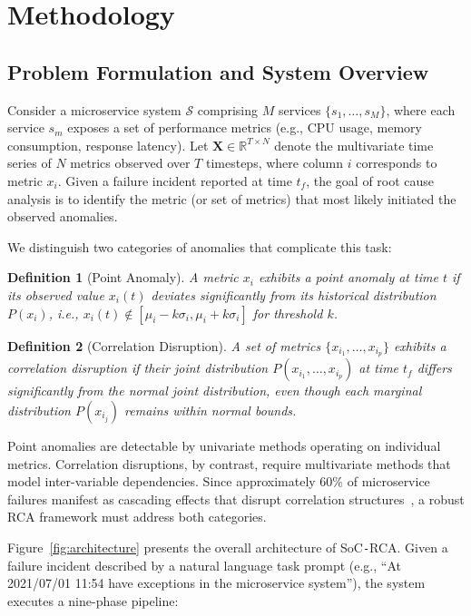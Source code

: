 \documentclass[a4paper,fleqn]{cas-dc}
\newtheorem{definition}{Definition}
\newcommand{\sysname}{SoC\texttt{-}RCA}
\begin{document}
\section{Methodology}
\label{sec:method}

\subsection{Problem Formulation and System Overview}

Consider a microservice system $\mathcal{S}$ comprising $M$ services $\{s_1, \ldots, s_M\}$, where each service $s_m$ exposes a set of performance metrics (e.g., CPU usage, memory consumption, response latency).  Let $\mathbf{X} \in \mathbb{R}^{T \times N}$ denote the multivariate time series of $N$ metrics observed over $T$ timesteps, where column $i$ corresponds to metric $x_i$.  Given a failure incident reported at time $t_f$, the goal of root cause analysis is to identify the metric (or set of metrics) that most likely initiated the observed anomalies.

We distinguish two categories of anomalies that complicate this task:
\begin{definition}[Point Anomaly]
A metric $x_i$ exhibits a point anomaly at time $t$ if its observed value $x_i(t)$ deviates significantly from its historical distribution $P(x_i)$, i.e., $x_i(t) \notin [\mu_i - k\sigma_i, \mu_i + k\sigma_i]$ for threshold $k$.
\end{definition}

\begin{definition}[Correlation Disruption]\label{def:correlation}
A set of metrics $\{x_{i_1}, \ldots, x_{i_p}\}$ exhibits a correlation disruption if their joint distribution $P(x_{i_1}, \ldots, x_{i_p})$ at time $t_f$ differs significantly from the normal joint distribution, even though each marginal distribution $P(x_{i_j})$ remains within normal bounds.
\end{definition}

Point anomalies are detectable by univariate methods operating on individual metrics.  Correlation disruptions, by contrast, require multivariate methods that model inter-variable dependencies.  Since approximately 60\% of microservice failures manifest as cascading effects that disrupt correlation structures~\cite{10.1145/3542929.3563482}, a robust RCA framework must address both categories.

Figure~\ref{fig:architecture} presents the overall architecture of \sysname{}.  Given a failure incident described by a natural language task prompt (e.g., ``At 2021/07/01 11:54 have exceptions in the microservice system''), the system executes a nine-phase pipeline:
\end{document}
